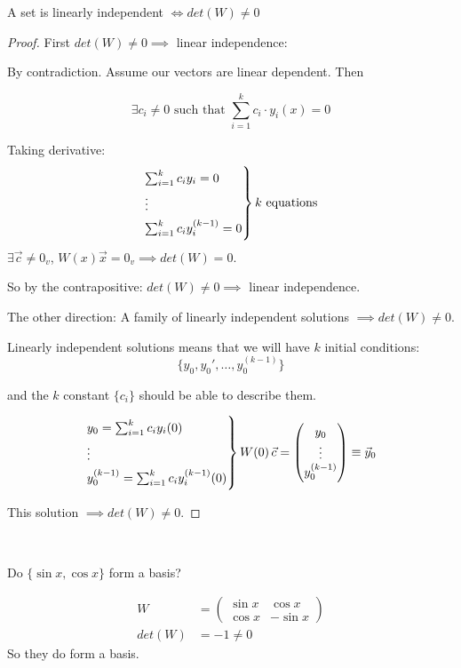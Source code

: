 \documentclass[twoside]{scrartcl}
\begin{document}
\begin{theorem}
A set is linearly independent $\iff det(W) \neq 0$	
\end{theorem}
\begin{proof}

First $det(W) \neq 0 \implies$ linear independence: 

By contradiction. Assume our vectors are linear dependent. Then

 \[\exists c_i \neq 0 \mbox{ such that } \sum_{i=1}^k c_i\cdot y_i(x) = 0\]
 
 Taking derivative: 
 \[\begin{rcases*}
\sum_{i=1}^k c_iy_i = 0\\
\vdots\\
\sum_{i=1}^k c_iy_i^{(k-1)} = 0	
\end{rcases*} k \text{ equations}
\]
$\exists \vec{c} \neq 0_v$, $W(x)\vec{x} = 0_v \implies det(W) = 0$. 

So by the contrapositive: $det(W) \neq 0 \implies$ linear independence. 

The other direction: A family of linearly independent solutions $\implies det(W) \neq 0$. 

Linearly independent solutions means that we will have $k$ initial conditions: 
\[\{y_0, y_0',\dots,y_0^{(k-1)}\}\]

and the $k$ constant $\{c_i\}$ should be able to describe them. 

	 \[\begin{rcases*}
y_0 = \sum_{i=1}^k c_iy_i(0) \\
\vdots\\
y_0^{(k-1)} = \sum_{i=1}^k c_iy_i^{(k-1)}(0)	
\end{rcases*} W(0)\,\vec{c} = \begin{pmatrix}
 y_0 \\ \vdots\\ y_0^{(k-1)}
 \end{pmatrix} \equiv \vec{y}_0	
\]

This solution $\implies det(W) \neq 0$. 
\end{proof}~

\begin{example}
Do $\{\sin x,\cos x\}$ form a basis? 

\[
\begin{aligned}
  W &= \begin{pmatrix}
 \sin x & \cos x\\
 \cos x & -\sin x	
 \end{pmatrix}\\
 det(W) &= -1 \neq 0
\end{aligned}
\]
So they do form a basis.
\end{example}
\end{document}

